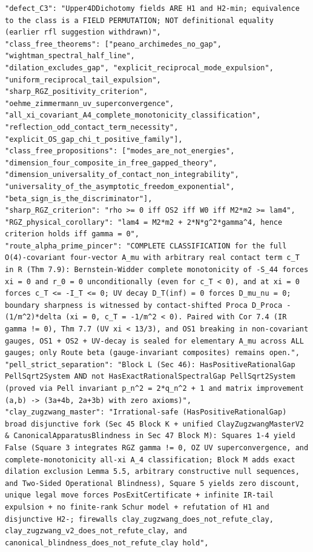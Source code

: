 \documentclass[11pt,a4paper]{article}
\theoremstyle{plain}
\theoremstyle{definition}
\theoremstyle{remark}
\renewcommand{\_}{\oldunderscore\allowbreak}
\begin{document}
\begin{Verbatim}[fontsize=\scriptsize,frame=single,rulecolor=\color{darkgray}]
"defect_C3": "Upper4DDichotomy fields ARE H1 and H2-min; equivalence to the class is a FIELD PERMUTATION; NOT definitional equality (earlier rfl suggestion withdrawn)",
"class_free_theorems": ["peano_archimedes_no_gap", "wightman_spectral_half_line",
"dilation_excludes_gap", "explicit_reciprocal_mode_expulsion", "uniform_reciprocal_tail_expulsion",
"sharp_RGZ_positivity_criterion", "oehme_zimmermann_uv_superconvergence",
"all_xi_covariant_A4_complete_monotonicity_classification",
"reflection_odd_contact_term_necessity", "explicit_OS_gap_chi_t_positive_family"],
"class_free_propositions": ["modes_are_not_energies",
"dimension_four_composite_in_free_gapped_theory",
"dimension_universality_of_contact_non_integrability",
"universality_of_the_asymptotic_freedom_exponential",
"beta_sign_is_the_discriminator"],
"sharp_RGZ_criterion": "rho >= 0 iff OS2 iff W0 iff M2*m2 >= lam4",
"RGZ_physical_corollary": "lam4 = M2*m2 + 2*N*g^2*gamma^4, hence criterion holds iff gamma = 0",
"route_alpha_prime_pincer": "COMPLETE CLASSIFICATION for the full O(4)-covariant four-vector A_mu with arbitrary real contact term c_T in R (Thm 7.9): Bernstein-Widder complete monotonicity of -S_44 forces xi = 0 and r_0 = 0 unconditionally (even for c_T < 0), and at xi = 0 forces c_T <= -I_T <= 0; UV decay D_T(inf) = 0 forces D_mu_nu = 0; boundary sharpness is witnessed by contact-shifted Proca D_Proca - (1/m^2)*delta (xi = 0, c_T = -1/m^2 < 0). Paired with Cor 7.4 (IR gamma != 0), Thm 7.7 (UV xi < 13/3), and OS1 breaking in non-covariant gauges, OS1 + OS2 + UV-decay is sealed for elementary A_mu across ALL gauges; only Route beta (gauge-invariant composites) remains open.",
"pell_strict_separation": "Block L (Sec 46): HasPositiveRationalGap PellSqrt2System AND not HasExactRationalSpectralGap PellSqrt2System (proved via Pell invariant p_n^2 = 2*q_n^2 + 1 and matrix improvement (a,b) -> (3a+4b, 2a+3b) with zero axioms)",
"clay_zugzwang_master": "Irrational-safe (HasPositiveRationalGap) broad disjunctive fork (Sec 45 Block K + unified ClayZugzwangMasterV2 & CanonicalApparatusBlindness in Sec 47 Block M): Squares 1-4 yield False (Square 3 integrates RGZ gamma != 0, OZ UV superconvergence, and complete-monotonicity all-xi A_4 classification; Block M adds exact dilation exclusion Lemma 5.5, arbitrary constructive null sequences, and Two-Sided Operational Blindness), Square 5 yields zero discount, unique legal move forces PosExitCertificate + infinite IR-tail expulsion + no finite-rank Schur model + refutation of H1 and disjunctive H2-; firewalls clay_zugzwang_does_not_refute_clay, clay_zugzwang_v2_does_not_refute_clay, and canonical_blindness_does_not_refute_clay hold",

\end{Verbatim}
\end{document}
